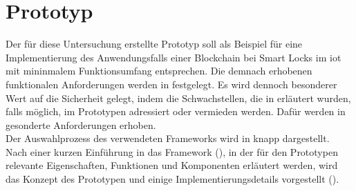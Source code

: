 \section{Prototyp}
\label{sec:prototype}
    Der für diese Untersuchung erstellte Prototyp soll als Beispiel für eine Implementierung des Anwendungsfalls einer Blockchain bei Smart Locks im \gls{iot} mit mininmalem Funktionsumfang entsprechen. 
    Die demnach erhobenen funktionalen Anforderungen werden in  festgelegt. 
    Es wird dennoch besonderer Wert auf die Sicherheit gelegt, indem die Schwachstellen, die in  erläutert wurden, falls möglich, im Prototypen adressiert oder vermieden werden. 
    Dafür werden in  gesonderte Anforderungen erhoben.
    \medskip\\
    Der Auswahlprozess des verwendeten Frameworks wird in  knapp dargestellt. 
    Nach einer kurzen Einführung in das Framework (), in der für den Prototypen relevante Eigenschaften, Funktionen und Komponenten erläutert werden, wird das Konzept des Prototypen und einige Implementierungsdetails vorgestellt (). 

